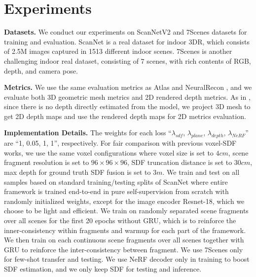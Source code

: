 \section{Experiments}
\noindent
\textbf{Datasets.}
We conduct our experiments on ScanNetV2 \cite{scannet} and 7Scenes datasets \cite{7scenes}  for training and evaluation. ScanNet is a real dataset for indoor 3DR, which consists of 2.5M images captured in 1513 different indoor scenes. 7Scenes is another challenging indoor real dataset, consisting of  7 scenes, with rich contents of RGB, depth, and camera pose.

\noindent
\textbf{Metrics.}
We use the same evaluation metrics as Atlas \cite{atlas} and NeuralRecon \cite{neucon}, and we evaluate both 3D geometric mesh metrics and 2D rendered depth metrics. As in \cite{atlas}, since there is no depth directly estimated from the model, we project 3D mesh to get 2D depth maps and use the rendered depth maps for 2D metrics evaluation.

\noindent
\textbf{Implementation Details.}
The weights for each loss ``$\lambda_{sdf}$, $\lambda_{plane}$, $\lambda_{depth}$, $\lambda_{NeRF}$'' are ``1, 0.05, 1, 1'', respectively. For fair comparison with previous voxel-SDF works, we use the same voxel configurations where voxel size is set to $4cm$, scene fragment resolution is set to $96\times96\times96$, SDF truncation distance is set to $30cm$, max depth for ground truth SDF fusion is set to $3m$. We train and test on all samples based on standard training/testing splits of ScanNet where entire framework is trained end-to-end in pure self-supervision from scratch with randomly initialized weights, except for the image encoder Resnet-18, which we choose to be light and efficient. We train on randomly separated scene fragments over all scenes for the first 20 epochs without GRU, which is to reinforce the inner-consistency within fragments and warmup for each part of the framework. We then train on each continuous scene fragments over all scenes together with GRU to reinforce the inter-consistency between fragment. We use 7Scenes only for few-shot transfer and testing. We use NeRF decoder only in training to boost SDF estimation, and we only keep SDF for testing and inference. 

